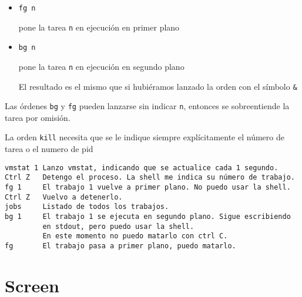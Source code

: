 \documentclass[ucs]{beamer}
\begin{document}
\begin{frame}[fragile]
\frametitle{}
\begin{itemize}
\item
\verb|fg n| 

pone la tarea \verb|n| en ejecución en primer plano
\item
\verb|bg n| 

pone la tarea \verb|n| en ejecución en segundo plano 

El resultado es el mismo que si hubiéramos lanzado la orden con el símbolo \verb|&|
\end{itemize}
Las órdenes 
\verb|bg| y
\verb|fg| 
pueden lanzarse sin indicar \verb|n|, entonces se sobreentiende la tarea
por omisión. 

La orden \verb|kill| necesita que se le indique siempre explícitamente
el número de tarea o el numero de pid

\end{frame}


\begin{frame}[fragile]
  \begin{footnotesize}
  \begin{verbatim}
vmstat 1 Lanzo vmstat, indicando que se actualice cada 1 segundo.
Ctrl Z   Detengo el proceso. La shell me indica su número de trabajo. 
fg 1     El trabajo 1 vuelve a primer plano. No puedo usar la shell.
Ctrl Z   Vuelvo a detenerlo.
jobs     Listado de todos los trabajos.
bg 1     El trabajo 1 se ejecuta en segundo plano. Sigue escribiendo
         en stdout, pero puedo usar la shell.
         En este momento no puedo matarlo con ctrl C.
fg       El trabajo pasa a primer plano, puedo matarlo.
  \end{verbatim}
  \end{footnotesize}



\end{frame}


\section{Screen}
\end{document}
